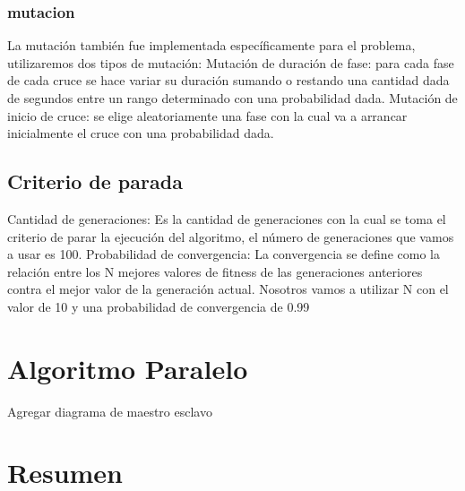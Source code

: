 \subsubsection{mutacion}
La  mutación también fue  implementada  específicamente para
el problema, utilizaremos dos tipos de mutación:
Mutación de duración de fase: para cada fase de cada cruce se
hace variar su duración sumando o restando una cantidad dada
de segundos entre un rango determinado con una probabilidad
dada.
Mutación de inicio de cruce: se elige aleatoriamente una fase
con  la  cual  va  a  arrancar  inicialmente  el  cruce  con  una
probabilidad dada.

\subsection{Criterio de parada}
 Cantidad  de  generaciones:  Es  la  cantidad  de
 generaciones  con  la  cual  se  toma  el  criterio  de  parar  la
 ejecución del algoritmo, el número de generaciones que vamos
 a usar es 100.
 Probabilidad  de  convergencia:  La  convergencia  se
 define como la relación entre los N mejores valores de fitness
 de  las  generaciones  anteriores  contra  el  mejor  valor  de  la
 generación actual. Nosotros vamos a utilizar N con el valor de
 10 y una probabilidad de convergencia de 0.99
 
\section{Algoritmo Paralelo}
Agregar diagrama de maestro esclavo
\section{Resumen}
